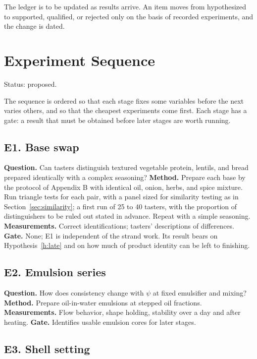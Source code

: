 \documentclass[11pt,openany]{book}
\theoremstyle{definition}
\begin{document}
The ledger is to be updated as results arrive. An item moves from hypothesized to supported, qualified, or rejected only on the basis of recorded experiments, and the change is dated.

\chapter{Experiment Sequence}\label{ch:sequence}

Status: proposed.

The sequence is ordered so that each stage fixes some variables before the next varies others, and so that the cheapest experiments come first. Each stage has a gate: a result that must be obtained before later stages are worth running.

\section*{E1. Base swap}

\textbf{Question.} Can tasters distinguish textured vegetable protein, lentils, and bread prepared identically with a complex seasoning? \textbf{Method.} Prepare each base by the protocol of Appendix B with identical oil, onion, herbs, and spice mixture. Run triangle tests for each pair, with a panel sized for similarity testing as in Section~\ref{sec:similarity}; a first run of 25 to 40 tasters, with the proportion of distinguishers to be ruled out stated in advance. Repeat with a simple seasoning. \textbf{Measurements.} Correct identifications; tasters' descriptions of differences. \textbf{Gate.} None; E1 is independent of the strand work. Its result bears on Hypothesis~\ref{h:late} and on how much of product identity can be left to finishing.

\section*{E2. Emulsion series}

\textbf{Question.} How does consistency change with $\psi$ at fixed emulsifier and mixing? \textbf{Method.} Prepare oil-in-water emulsions at stepped oil fractions. \textbf{Measurements.} Flow behavior, shape holding, stability over a day and after heating. \textbf{Gate.} Identifies usable emulsion cores for later stages.

\section*{E3. Shell setting}
\end{document}
